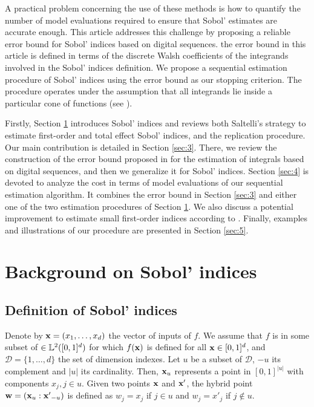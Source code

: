 A practical problem concerning the use of these methods is how to quantify the number of model evaluations required to ensure that Sobol' estimates are accurate enough. This article addresses this challenge by proposing a reliable error bound for Sobol' indices based on digital sequences.  the error bound in this article is defined in terms of the discrete Walsh coefficients of the integrands involved in the Sobol' indices definition. We propose a sequential estimation procedure of Sobol' indices using the error bound as our stopping criterion. The procedure operates under the assumption that all integrands lie inside a particular cone of functions (see \cite{HicJim}).

Firstly, Section \ref{sec:2} introduces Sobol' indices and reviews both Saltelli's strategy to estimate first-order and total effect Sobol' indices, and the replication procedure. Our main contribution is detailed in  Section \ref{sec:3}. There, we review the construction of the error bound proposed in \cite{HicJim} for the estimation of integrals based on digital sequences, and then we generalize it for Sobol' indices. Section \ref{sec:4} is devoted to analyze the cost in terms of model evaluations of our sequential estimation algorithm. It combines the error bound in Section \ref{sec:3} and either one of the two estimation procedures of Section \ref{sec:2}. We also discuss a potential improvement to estimate small first-order indices according to \cite{Owen}. Finally, examples and illustrations of our procedure are presented in Section \ref{sec:5}. 

\section{Background on Sobol' indices}
\label{sec:2}

\subsection{Definition of Sobol' indices}
\label{sec:2.1}
Denote by $\boldsymbol{\mathbf{x}}=(x_1,\dots,x_d)$ the vector of inputs of $f$. We assume that $f$ is in some subset of $\in \mathbb{L}^2([0,1]^d)$ for which $f(\boldsymbol{\mathbf{x}})$ is defined for all $\boldsymbol{\mathbf{x}}\in[0,1]^d$, and $\mathcal{D}=\{1,\dots,d\}$ the set of dimension indexes. %
Let $u$ be a subset of $\mathcal{D}$, $-u$ its complement and $|u|$ its cardinality. Then, $\boldsymbol{\mathbf{x}}_u$ represents a point in $[0,1]^{|u|}$ with components $x_j, j \in u$. Given two points $\boldsymbol{\mathbf{x}}$ and $\boldsymbol{\mathbf{x}}'$, the hybrid point $\boldsymbol{\mathbf{w}}=(\boldsymbol{\mathbf{x}}_u:{\boldsymbol{\mathbf{x}}'}_{-u})$ is defined as $w_j=x_j$ if $j \in u$ and $w_j=x'_j$ if $j \notin u$.%


